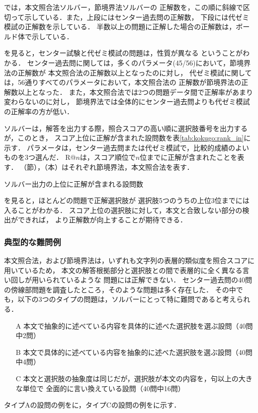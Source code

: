 \documentclass[japanese]{jnlp_1.4b}
\def\FIGREF#1{}
\def\TABREF#1{}
\begin{document}
\TABREF{tab:kokugo:result}では，本文照合法ソルバー，節境界法ソルバーの
正解数を，この順に斜線で区切って示している．また，上段にはセンター過去問の正解数，
下段には代ゼミ模試の正解数を示している．
半数以上の問題に正解した場合の正解数は，ボールド体で示している．

\TABREF{tab:kokugo:result}を見ると，センター試験と代ゼミ模試の問題は，性質が異なる
ということがわかる．
センター過去問に関しては，多くのパラメータ(45/56)において，節境界法の正解数が
本文照合法の正解数以上となったのに対し，
代ゼミ模試に関しては，56通りすべてのパラメータにおいて，本文照合法の
正解数が節境界法の正解数以上となった．
また，本文照合法では2つの問題データ間で正解率があまり変わらないのに対し，
節境界法では全体的にセンター過去問よりも代ゼミ模試の正解率の方が低い．

ソルバーは，解答を出力する際，照合スコアの高い順に選択肢番号を出力するが，このとき，
スコア上位に正解が含まれた設問数を表\ref{tab:kokugo:rank_in}に示す．
パラメータは，センター過去問または代ゼミ模試で，比較的成績のよいものを3つ選んだ．
R@$n$は，スコア順位で$n$位までに正解が含まれたことを表す．
（節），（本）はそれぞれ節境界法，本文照合法を表す．

\begin{table}[t]
\caption{ソルバー出力の上位に正解が含まれる設問数}
\label{tab:kokugo:rank_in}

\end{table}

\TABREF{tab:kokugo:rank_in}を見ると，ほとんどの問題で正解選択肢が
選択肢5つのうちの上位3位までには入ることがわかる．
スコア上位の選択肢に対して，本文と合致しない部分の検出ができれば，
より正解数が向上することが期待できる．


\subsubsection{典型的な難問例}

本文照合法，および節境界法は，いずれも文字列の表層的類似度を照合スコアに用いているため，
本文の解答根拠部分と選択肢との間で表層的に全く異なる言い回しが用いられているような
問題には正解できない．
センター過去問の40問の傍線部問題を調査したところ，そのような問題は多く存在した．
その中でも，以下の3つのタイプの問題は，ソルバーにとって特に難問であると考えられる．
\begin{itemize}
\item[A] 本文で抽象的に述べている内容を具体的に述べた選択肢を選ぶ設問（40問中2問）
\item[B] 本文で具体的に述べている内容を抽象的に述べた選択肢を選ぶ設問（40問中4問）
\item[C] 本文と選択肢の抽象度は同じだが，選択肢が本文の内容を，句以上の大きな単位で
    全面的に言い換えている設問（40問中16問）
\end{itemize}
タイプAの設問の例を\FIGREF{fig:kokugo:difficultA}に，タイプCの設問の例を\FIGREF{fig:kokugo:difficult}に示す．
\end{document}
